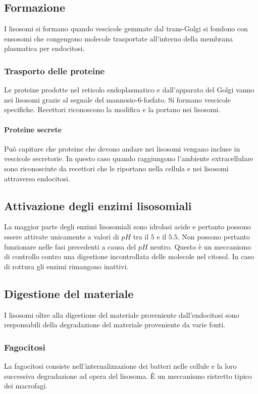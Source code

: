	\subsection{Formazione}
	I lisosomi si formano quando vescicole gemmate dal trans-Golgi si fondono con ensosomi che congengono molecole trasportate all'interno della membrana plasmatica per endocitosi.

		\subsubsection{Trasporto delle proteine}
		Le proteine prodotte nel reticolo endoplasmatico e dall'apparato del Golgi vanno nei lisosomi grazie al segnale del mannosio-6-fosfato.
		Si formano vescicole specifiche.
		Recettori riconoscono la modifica e la portano nei lisosomi.
		

			\paragraph{Proteine secrete}
			Pu\`o capitare che proteine che devono andare nei lisosomi vengano incluse in vescicole secretorie.
			In questo caso quando raggiungono l'ambiente extracellulare sono riconosciute da recettori che le riportano nella cellula e nei lisosomi attraverso endocitosi.

	\subsection{Attivazione degli enzimi lisosomiali}
	La maggior parte degli enzimi lisosomiali sono idrolasi acide e pertanto possono essere attivate unicamente a valori di $pH$ tra il $5$ e il $5.5$.
	Non possono pertanto funzionare nelle fasi precedenti a causa del $pH$ neutro.
	Questo \`e un meccanismo di controllo contro una digestione incontrollata delle molecole nel citosol.
	In caso di rottura gli enzimi rimangono inattivi.

	\subsection{Digestione del materiale}
	I lisosomi oltre alla digestione del materiale proveniente dall'endocitosi sono responsabili della degradazione del materiale proveniente da varie fonti.

		\subsubsection{Fagocitosi}
		La fagocitosi consiste nell'internalizzazione dei batteri nelle cellule e la loro successiva degradazione ad opera del lisosoma.
		\`E un meccanismo ristretto tipico dei macrofagi.

